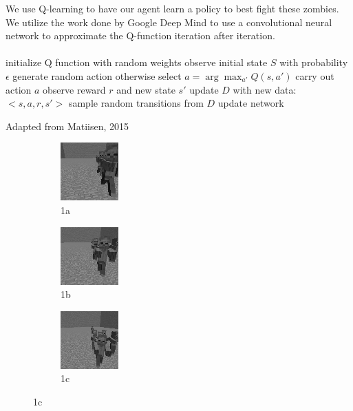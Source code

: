 \documentclass{article}
\begin{document}
\begin{multicols}{2}
We use Q-learning to have our agent learn a policy to best fight these zombies.
We utilize the work done by Google Deep Mind to use a convolutional neural network to approximate the Q-function iteration after iteration.
\paragraph{}


\begin{algorithm*}[H]
     \SetAlgoLined
     initialize Q function with random weights \;
     observe initial state $S$ \;
      {
        with probability $\epsilon$ generate random action \;
        otherwise select $a = \arg\max_{a'} Q(s,a')$ \;
        carry out action $a$ \;
        observe reward $r$ and new state $s'$ \;
        update $D$ with new data: $<s,a,r,s'>$ \;
        sample random transitions from $D$ \;
        update network \;
     }
     \caption{Adapted from Matiisen, 2015}
\end{algorithm*}

\begin{figure}[H]
\caption{Images of processed features}
\begin{subfigure}{.25\textwidth}
  \centering
  \includegraphics[scale=1.0]{./messigray1.png}
  \caption{1a}
  \label{fig:sfig1}
\end{subfigure}%
\begin{subfigure}{.25\textwidth}
  \centering
  \includegraphics[scale=1.0]{./messigray2.png}
  \caption{1b}
  \label{fig:sfig2}
\end{subfigure}
\begin{subfigure}{.25\textwidth}
  \centering
  \includegraphics[scale=1.0]{./messigray3.png}
  \caption{1c}
  \label{fig:sfig3}
\end{subfigure}
\label{fig:fig}
\end{figure}




\end{multicols}
\end{document}
